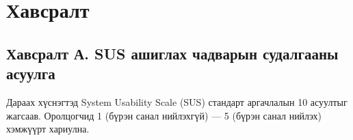 

\appendix
{}
{}
\chapter*{Хавсралт}

\section*{Хавсралт А. SUS ашиглах чадварын судалгааны асуулга}

Дараах хүснэгтэд System Usability Scale (SUS) стандарт аргачлалын 10 асуултыг жагсаав.
Оролцогчид 1 (бүрэн санал нийлэхгүй) --- 5 (бүрэн санал нийлэх) хэмжүүрт хариулна.

